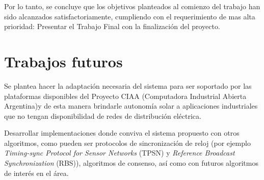 \medskip

Por lo tanto, se concluye que los objetivos planteados al comienzo del trabajo han sido alcanzados satisfactoriamente, cumpliendo con el requerimiento de mas alta prioridad: Presentar el Trabajo Final con la finalización del proyecto.

\section{Trabajos futuros}

Se plantea hacer la adaptación necesaria del sistema para ser soportado por las plataformas disponibles del Proyecto CIAA \citep{CIAA} (Computadora Industrial Abierta Argentina)y de esta manera brindarle autonomía solar a aplicaciones industriales que no tengan disponibilidad de redes de distribución eléctrica.

Desarrollar implementaciones donde conviva el sistema propuesto con otros algoritmos, como pueden ser protocolos de sincronización de reloj (por ejemplo \textit{Timing-sync Protocol for Sensor Networks} (TPSN) y \textit{Reference Broadcast Synchronization} (RBS)), algoritmos de consenso, así como con futuros algoritmos de interés en el área.









